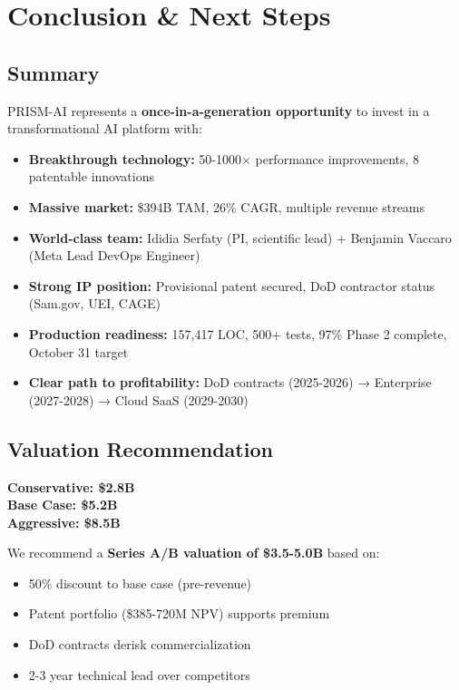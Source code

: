 \documentclass[11pt,letterpaper]{article}
\begin{document}
\newpage

\section{Conclusion \& Next Steps}

\subsection{Summary}

PRISM-AI represents a \textbf{once-in-a-generation opportunity} to invest in a transformational AI platform with:

\begin{itemize}
    \item \textbf{Breakthrough technology:} 50-1000× performance improvements, 8 patentable innovations
    \item \textbf{Massive market:} \$394B TAM, 26\% CAGR, multiple revenue streams
    \item \textbf{World-class team:} Ididia Serfaty (PI, scientific lead) + Benjamin Vaccaro (Meta Lead DevOps Engineer)
    \item \textbf{Strong IP position:} Provisional patent secured, DoD contractor status (Sam.gov, UEI, CAGE)
    \item \textbf{Production readiness:} 157,417 LOC, 500+ tests, 97\% Phase 2 complete, October 31 target
    \item \textbf{Clear path to profitability:} DoD contracts (2025-2026) → Enterprise (2027-2028) → Cloud SaaS (2029-2030)
\end{itemize}

\subsection{Valuation Recommendation}

\begin{tcolorbox}[colback=lightgray,colframe=successgreen,title=Investor Valuation]
\centering
\Large
\textbf{Conservative: \$2.8B}\\
\textbf{Base Case: \$5.2B}\\
\textbf{Aggressive: \$8.5B}

\vspace{0.3cm}
\normalsize
We recommend a \textbf{Series A/B valuation of \$3.5-5.0B} based on:
\begin{itemize}[leftmargin=*]
    \item 50\% discount to base case (pre-revenue)
    \item Patent portfolio (\$385-720M NPV) supports premium
    \item DoD contracts derisk commercialization
    \item 2-3 year technical lead over competitors
\end{itemize}
\end{tcolorbox}
\end{document}
